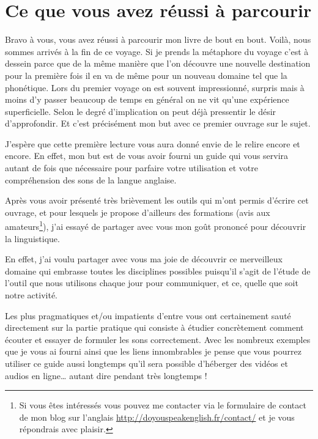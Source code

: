 \chapter{Ce que vous avez réussi à parcourir}\label{chap:success}

Bravo à vous, vous avez réussi à parcourir mon livre de bout en
bout. Voilà, nous sommes arrivés à la fin de ce voyage. Si je prends
la métaphore du voyage c'est à dessein parce que de la même manière
que l'on découvre une nouvelle destination pour la première fois il en
va de même pour un nouveau domaine tel que la phonétique. Lors du
premier voyage on est souvent impressionné, surpris mais à moins d'y
passer beaucoup de temps en général on ne vit qu'une expérience
superficielle. Selon le degré d'implication on peut déjà pressentir le
désir d'approfondir. Et c'est précisément mon but avec ce premier
ouvrage sur le sujet.

J'espère que cette première lecture vous aura donné envie de le relire
encore et encore. En effet, mon but est de vous avoir fourni un guide
qui vous servira autant de fois que nécessaire pour parfaire votre
utilisation et votre compréhension des sons de la langue anglaise.

Après vous avoir présenté très brièvement les outils qui m'ont permis
d'écrire cet ouvrage, et pour lesquels je propose d'ailleurs des
formations (avis aux amateurs\footnote{Si vous êtes intéressés vous
  pouvez me contacter via le formulaire de contact de mon blog sur
  l'anglais \url{http://doyouspeakenglish.fr/contact/} et je vous
  répondrais avec plaisir.}), j'ai essayé de partager avec vous mon
goût prononcé pour découvrir la linguistique.

En effet, j'ai voulu partager avec vous ma joie de découvrir ce
merveilleux domaine qui embrasse toutes les disciplines possibles
puisqu'il s'agit de l'étude de l'outil que nous utilisons chaque jour
pour communiquer, et ce, quelle que soit notre activité.

Les plus pragmatiques et/ou impatients d'entre vous ont certainement
sauté directement sur la partie pratique qui consiste à étudier
concrètement comment écouter et essayer de formuler les sons
correctement. Avec les nombreux exemples que je vous ai fourni ainsi
que les liens innombrables je pense que vous pourrez utiliser ce guide
aussi longtemps qu'il sera possible d'héberger des vidéos et audios en
ligne\dots{} autant dire pendant très longtemps !

